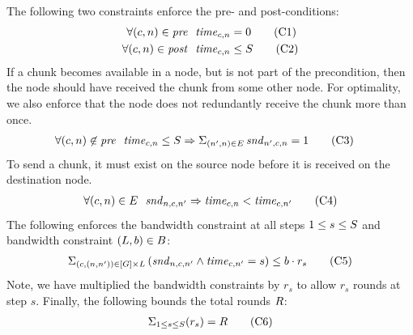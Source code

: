 The following two constraints enforce the pre- and post-conditions:
\begin{align}
    \forall (c,n) \in \mathit{pre} \ \ \mathit{time}_{c,n} &=0
    \tag{C1}\label{eqn:bc-zero} \\
    \forall (c,n) \in \mathit{post} \ \ \mathit{time}_{c,n}&\leq S
    \tag{C2}\label{eqn:bc-insteps}
\end{align}
If a chunk becomes available in a node, but is not part of the
precondition, then the node should have received the chunk from some
other node. For optimality, we also enforce that the node does not
redundantly receive the chunk more than once.
\begin{align}
    \forall (c,n) \not\in \mathit{pre} \ \ \mathit{time}_{c,n}&\leq S \Rightarrow \Sigma_{(n',n)\in E}\,\mathit{snd}_{n',c,n}=1
    \tag{C3}\label{eqn:bc-hassender}
\end{align}
To send a chunk, it must exist on the source node before it is
received on the destination node.
\begin{align}
    \forall (c,n) \in E \ \ \mathit{snd}_{n,c,n'}\Rightarrow\mathit{time}_{c,n}<\mathit{time}_{c,n'}
    \tag{C4}\label{eqn:bc-sendexisting}
\end{align}
The following enforces the bandwidth constraint at all steps $1 \leq s
\leq S$ and bandwidth constraint $(L,b)\in B$:
\begin{align}
    \Sigma_{(c,(n,n'))\in\left[G\right]\times L}\left(\mathit{snd}_{n,c,n'}\wedge\mathit{time}_{c,n'}=s\right)\leq b \cdot r_s
    \tag{C5}\label{eqn:bc-bw}
\end{align}
%
Note, we have multiplied the bandwidth constraints by $r_s$ to allow
$r_s$ rounds at step $s$.
%
Finally, the following bounds the total rounds $R$:
\begin{align}
    \Sigma_{1\leq s\leq S}(r_s)=R
    \tag{C6}\label{eqn:bc-rounds}
\end{align}

